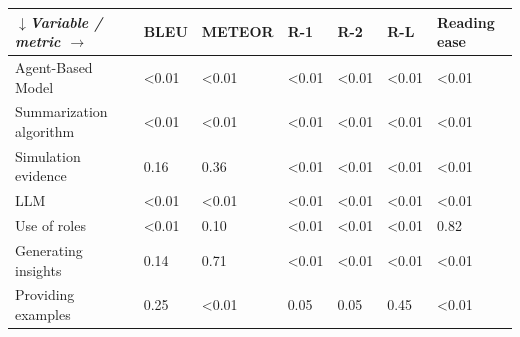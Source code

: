 \begin{tabular}{|l|l|l|l|l|l|l|}
\hline
\textit{$\downarrow$Variable / metric $\rightarrow$} & BLEU & METEOR & R-1 & R-2 & R-L & Reading ease \\
 \hline
 Agent-Based Model & \textless{}0.01 & \textless{}0.01 & \textless{}0.01 & \textless{}0.01 & \textless{}0.01 & \textless{}0.01 \\
 \hline
 Summarization algorithm & \textless{}0.01 & \textless{}0.01 & \textless{}0.01 & \textless{}0.01 & \textless{}0.01 & \textless{}0.01 \\
 \hline
 Simulation evidence & 0.16 & 0.36 & \textless{}0.01 & \textless{}0.01 & \textless{}0.01 & \textless{}0.01 \\
 \hline
 LLM & \textless{}0.01 & \textless{}0.01 & \textless{}0.01 & \textless{}0.01 & \textless{}0.01 & \textless{}0.01 \\
 \hline
 Use of roles & \textless{}0.01 & 0.10 & \textless{}0.01 & \textless{}0.01 & \textless{}0.01 & 0.82 \\
 \hline
 Generating insights & 0.14 & 0.71 & \textless{}0.01 & \textless{}0.01 & \textless{}0.01 & \textless{}0.01 \\
 \hline
 Providing examples & 0.25 & \textless{}0.01 & 0.05 & 0.05 & 0.45 & \textless{}0.01 \\
\hline
\end{tabular}

